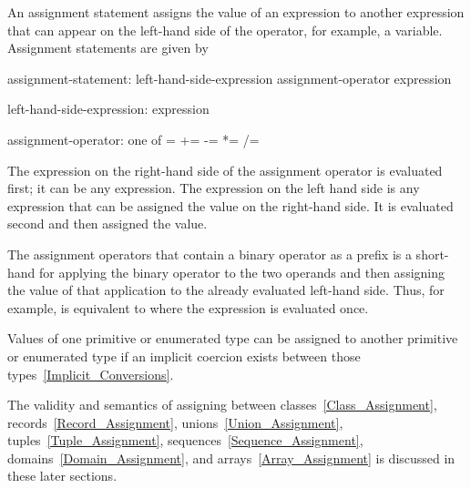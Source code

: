 An assignment statement assigns the value of an expression to another
expression that can appear on the left-hand side of the operator, for
example, a variable.  Assignment statements are given by

\begin{syntax}
assignment-statement:
  left-hand-side-expression assignment-operator expression

left-hand-side-expression:
  expression

assignment-operator: one of
   = += -= *= /= %
\end{syntax}

The expression on the right-hand side of the assignment operator is
evaluated first; it can be any expression.  The expression on the left
hand side is any expression that can be assigned the value on the
right-hand side.  It is evaluated second and then assigned the value.

The assignment operators that contain a binary operator as a prefix is
a short-hand for applying the binary operator to the two operands and
then assigning the value of that application to the already evaluated
left-hand side.  Thus, for example,  is equivalent to
 where the expression  is evaluated once.

Values of one primitive or enumerated type can be assigned to another
primitive or enumerated type if an implicit coercion exists between
those types~\ref{Implicit_Conversions}.

The validity and semantics of assigning between
classes~\ref{Class_Assignment}, records~\ref{Record_Assignment},
unions~\ref{Union_Assignment}, tuples~\ref{Tuple_Assignment},
sequences~\ref{Sequence_Assignment}, domains~\ref{Domain_Assignment},
and arrays~\ref{Array_Assignment} is discussed in these later
sections.
